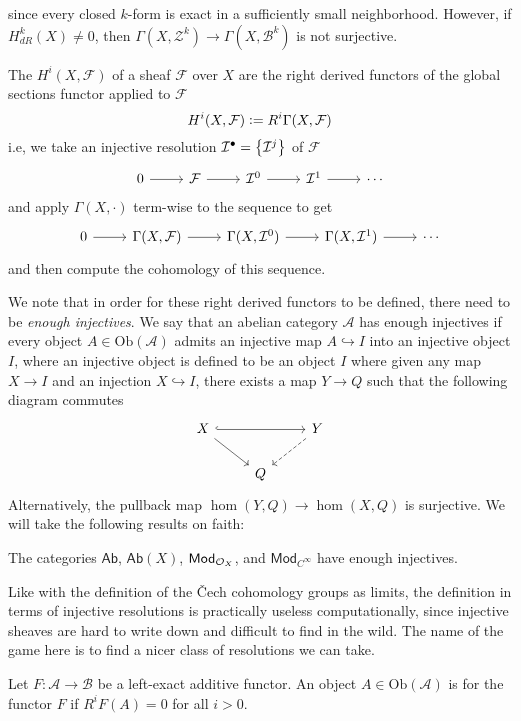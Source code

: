 since every closed $k$-form is exact in a sufficiently small neighborhood. However,
if $H^k_{dR}(X) \neq 0$, then $\Gamma(X,\mathcal{Z}^k) \to \Gamma(X, \mathcal{B}^k)$
is not surjective.
%
\begin{defn}
The  $H^i(X, \mathcal{F})$ of a sheaf $\mathcal{F}$ over $X$
are the right derived functors of the global sections functor applied to $\mathcal{F}$
\[
H^i(X,\mathcal{F}) \vcentcolon= R^i\Gamma(X,\mathcal{F})
\]
i.e, we take an injective resolution $\mathcal{I}^\bullet = \left\lbrace \mathcal{I}^j \right\rbrace$ of
$\mathcal{F}$
\[\begin{tikzcd}
0 \ar[r] & \mathcal{F} \ar[r] & \mathcal{I}^0 \ar[r] & \mathcal{I}^1 \ar[r] & \cdots
\end{tikzcd}\]
and apply $\Gamma(X,\cdot)$ term-wise to the sequence to get
\[\begin{tikzcd}
0 \ar[r] & \Gamma(X,\mathcal{F}) \ar[r] & \Gamma(X,\mathcal{I}^0) \ar[r]
& \Gamma(X,\mathcal{I}^1) \ar[r] & \cdots
\end{tikzcd}\]
and then compute the cohomology of this sequence.
\end{defn}
%
We note that in order for these right derived functors to be defined, there need to
be \emph{enough injectives}. We say that an abelian category $\mathcal{A}$ has enough
injectives if every object $A \in \mathrm{Ob}(\mathcal{A})$ admits an injective
map $A \hookrightarrow I$ into an injective object $I$, where an injective object
is defined to be an object $I$ where given any map $X \to I$ and an injection
$X \hookrightarrow I$, there exists a map $Y \to Q$ such that the following diagram
commutes
\[\begin{tikzcd}
X \ar[dr]\ar[rr,hookrightarrow] & & Y \ar[dl, dashed] \\
& Q
\end{tikzcd}\]
Alternatively, the pullback map $\hom(Y,Q) \to \hom(X,Q)$ is surjective. We will take
the following results on faith:
%
\begin{thm}
The categories $\mathsf{Ab}$, $\mathsf{Ab}(X)$, $\mathsf{Mod}_{\mathcal{O}_X}$,
and $\mathsf{Mod}_{C^\infty}$ have
enough injectives.
\end{thm}
%
Like with the definition of the \v{C}ech cohomology groups as limits, the
definition in terms of injective resolutions is practically useless computationally,
since injective sheaves are hard to write down and difficult to find in the wild.
The name of the game here is to find a nicer class of resolutions we can take.
%
\begin{defn}
Let $F : \mathcal{A} \to \mathcal{B}$ be a left-exact additive functor. An object
$A \in \mathrm{Ob}(\mathcal{A})$ is  for the functor $F$ if
$R^iF(A) = 0$ for all $i > 0$.
\end{defn}
